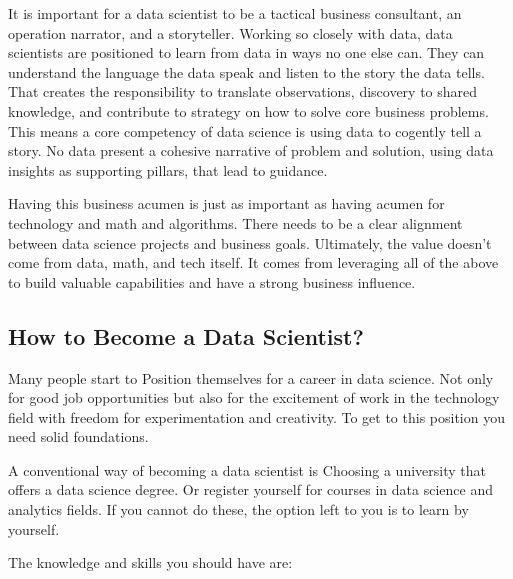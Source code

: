 \documentclass[
]{book}
\begin{document}
It is important for a data scientist to be a tactical business consultant, an operation narrator, and a storyteller. Working so closely with data, data scientists are positioned to learn from data in ways no one else can. They can understand the language the data speak and listen to the story the data tells. That creates the responsibility to translate observations, discovery to shared knowledge, and contribute to strategy on how to solve core business problems. This means a core competency of data science is using data to cogently tell a story. No data present a cohesive narrative of problem and solution, using data insights as supporting pillars, that lead to guidance.

Having this business acumen is just as important as having acumen for technology and math and algorithms. There needs to be a clear alignment between data science projects and business goals. Ultimately, the value doesn't come from data, math, and tech itself. It comes from leveraging all of the above to build valuable capabilities and have a strong business influence.

\hypertarget{how-to-become-a-data-scientist}{%
\subsection*{How to Become a Data Scientist?}\label{how-to-become-a-data-scientist}}


Many people start to Position themselves for a career in data science. Not only for good job opportunities but also for the excitement of work in the technology field with freedom for experimentation and creativity. To get to this position you need solid foundations.

A conventional way of becoming a data scientist is Choosing a university that offers a data science degree. Or register yourself for courses in data science and analytics fields. If you cannot do these, the option left to you is to learn by yourself.

The knowledge and skills you should have are:
\end{document}

